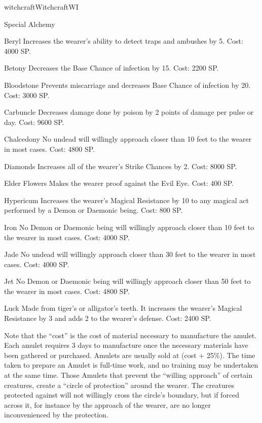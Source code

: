 \begin{college}[1.1]{witchcraft}{Witchcraft}{WI}
\begin{talent}[T-2]{Special Alchemy}
\begin{effects}
\begin{Description}
\item[Beryl]
Increases the wearer's ability to detect traps and ambushes by 5.
Cost: 4000 SP.

\item[Betony]
Decreases the Base Chance of infection by 15. Cost: 2200 SP.

\item[Bloodstone]
Prevents miscarriage and decreases Base Chance of infection by 20.
Cost: 3000 SP.

\item[Carbuncle]
Decreases damage done by poison by 2 points of damage per pulse or
day. Cost: 9600 SP.

\item[Chalcedony]
No undead will willingly approach closer than 10 feet to the wearer in
most cases. Cost: 4800 SP.

\item[Diamonds]
Increases all of the wearer's Strike Chances by 2. Cost: 8000 SP.

\item[Elder Flowers]
Makes the wearer proof against the Evil Eye. Cost: 400 SP.

\item[Hypericum]
Increases the wearer's Magical Resistance by 10 to any magical act
performed by a Demon or Daemonic being.  Cost: 800 SP.

\item[Iron]
No Demon or Daemonic being will willingly approach closer than 10 feet
to the wearer in most cases. Cost: 4000 SP.

\item[Jade]
No undead will willingly approach closer than 30 feet to the wearer in
most cases. Cost: 4000 SP.

\item[Jet]
No Demon or Daemonic being will willingly approach closer than
50 feet to the wearer in most cases. Cost: 4800 SP.

\item[Luck]
Made from tiger's or alligator's teeth.  It increases the wearer's
Magical Resistance by 3 and adds 2 to the wearer's defense. Cost: 2400
SP.
\end{Description}

Note that the ``cost'' is the cost of material necessary to manufacture
the amulet.  Each amulet requires 3 days to manufacture once the
necessary materials have been gathered or purchased.  Amulets are
usually sold at (cost + 25\%).  The time taken to prepare an Amulet is
full-time work, and no training may be undertaken at the same time.
Those Amulets that prevent the ``willing approach'' of certain
creatures, create a ``circle of protection'' around the wearer.  The
creatures protected against will not willingly cross the circle's
boundary, but if forced across it, for instance by the approach of the
wearer, are no longer inconvenienced by the protection.


\end{effects}
\end{talent}
\end{college}
